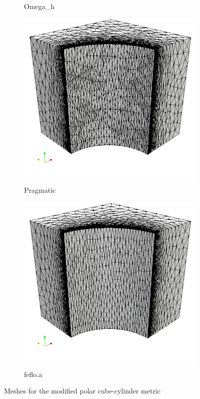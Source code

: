 \documentclass[3p,times,procedia,number]{elsarticle}
\begin{document}
\begin{figure}
\begin{subfigure}{.24\textwidth}
\caption{Omega\_h}
\end{subfigure}
\begin{subfigure}{.24\textwidth}
\centering
\includegraphics[width=\textwidth]{pragmatic-cube-cylinder-polar-2.png}
\caption{Pragmatic}
\end{subfigure}
\begin{subfigure}{.24\textwidth}
\centering
\includegraphics[width=\textwidth]{fefloa-cube-cylinder-polar-2.png}
\caption{feflo.a}
\end{subfigure}
\caption{Meshes for the modified polar cube-cylinder metric}
\label{fig:cube-cylinder-polar-2-meshes}
\end{figure}
\end{document}
